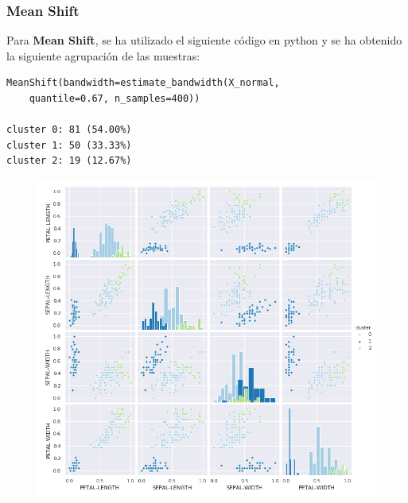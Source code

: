 \documentclass[spanish]{beamer}
\begin{document}
\begin{frame}[fragile]
\frametitle{Mean Shift}
Para \textbf{Mean Shift}, se ha utilizado el siguiente código en python y se ha obtenido la siguiente agrupación de las muestras:\break
\begin{lstlisting}
MeanShift(bandwidth=estimate_bandwidth(X_normal, 
	quantile=0.67, n_samples=400))

cluster 0: 81 (54.00%)
cluster 1: 50 (33.33%)
cluster 2: 19 (12.67%)
\end{lstlisting}
\end{frame}

\begin{frame}
\begin{figure}[h]
\centering
\includegraphics[scale=0.34]{dani/scatmatrixMeanShiftIRIS.png}
\end{figure}
\end{frame}
\end{document}
